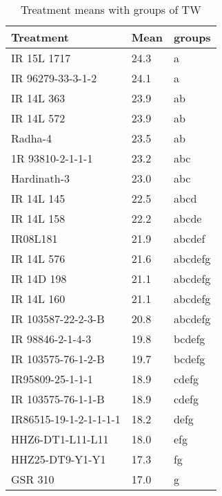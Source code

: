\documentclass[]{article}
\begin{document}
\begin{longtable}{lll}
\caption{\label{tab:two-fac-groups-tab2}Treatment means with groups of TW}\\
\toprule
Treatment & Mean & groups\\
\midrule
\rowcolor{gray!6}  IR 15L 1717 & 24.3 & a\\
IR 96279-33-3-1-2 & 24.1 & a\\
\rowcolor{gray!6}  IR 14L 363 & 23.9 & ab\\
IR 14L 572 & 23.9 & ab\\
\rowcolor{gray!6}  Radha-4 & 23.5 & ab\\
\addlinespace
1R 93810-2-1-1-1 & 23.2 & abc\\
\rowcolor{gray!6}  Hardinath-3 & 23.0 & abc\\
IR 14L 145 & 22.5 & abcd\\
\rowcolor{gray!6}  IR 14L 158 & 22.2 & abcde\\
IR08L181 & 21.9 & abcdef\\
\addlinespace
\rowcolor{gray!6}  IR 14L 576 & 21.6 & abcdefg\\
IR 14D 198 & 21.1 & abcdefg\\
\rowcolor{gray!6}  IR 14L 160 & 21.1 & abcdefg\\
IR 103587-22-2-3-B & 20.8 & abcdefg\\
\rowcolor{gray!6}  IR 98846-2-1-4-3 & 19.8 & bcdefg\\
\addlinespace
IR 103575-76-1-2-B & 19.7 & bcdefg\\
\rowcolor{gray!6}  IR95809-25-1-1-1 & 18.9 & cdefg\\
IR 103575-76-1-1-B & 18.9 & cdefg\\
\rowcolor{gray!6}  IR86515-19-1-2-1-1-1-1 & 18.2 & defg\\
HHZ6-DT1-L11-L11 & 18.0 & efg\\
\addlinespace
\rowcolor{gray!6}  HHZ25-DT9-Y1-Y1 & 17.3 & fg\\
GSR 310 & 17.0 & g\\
\bottomrule
\end{longtable}
\endgroup{}
\begingroup\fontsize{12}{14}\selectfont
\end{document}
